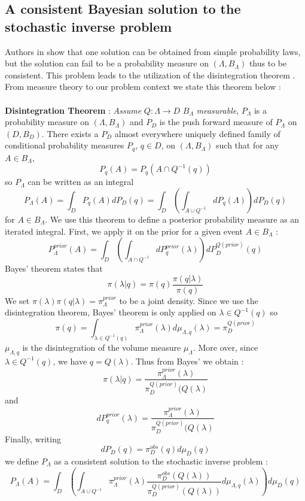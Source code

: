 \documentclass[11pt, a4paper, English]{report}
\begin{document}
\subsection{A consistent Bayesian solution to the stochastic inverse problem}
Authors in \cite{Tim1} show that one solution can be obtained from simple probability laws, but the solution can fail to be a probability measure on $(\Lambda, B_\Lambda)$ thus to be consistent. This problem leads to the utilization of the disintegration theorem \cite{desintegration}. From measure theory to our problem context we state this theorem below :
\\\\
\textbf{Disintegration Theorem} : \textit{Assume} $Q:\Lambda \rightarrow D$ $B_\Lambda$ \textit{measurable}, $P_\Lambda$ is a probability measure on $(\Lambda, B_\Lambda)$ and $P_D$ is the push forward measure of $P_\Lambda$ on $(D, B_D)$. There exists a $P_D$ almost everywhere uniquely defined family of conditional probability measures $P_q$, $q \in D$, on $(\Lambda, B_\Lambda)$ such that for any $A \in B_\Lambda$,
$$P_q(A) = P_q(A \cap Q^{-1}(q))$$
so $P_\Lambda$ can be written as an integral 
$$P_\Lambda(A) = \int_D P_q(A)dP_D(q) = \int_D(\int_{A\cup Q^{-1}} dP_q(\Lambda) )dP_D(q) $$
for $A \in B_\Lambda$. We use this theorem to define a posterior probability measure as an iterated integral. First, we apply it on the prior for a given event $A \in B_\Lambda$ : 
$$ P_\Lambda^{prior}(A) = \int_D (\int_{A\cap Q^{-1}}dP_q^{prior}(\lambda))dP_D^{Q(prior)}(q)$$
Bayes' theorem states that 
$$\pi(\lambda|q) = \pi(q) \frac{\pi(q|\lambda)}{\pi(q)}$$
We set $\pi(\lambda)\pi(q|\lambda) = \pi_\Lambda^{prior}$ to be a joint density. Since we use the disintegration theorem, Bayes' theorem is only applied on $\lambda \in Q^{-1}(q)$ so 
$$\pi(q) = \int_{\lambda \in Q^{-1}(q)} \pi_\Lambda^{prior}(\lambda) d\mu_{\Lambda,q}(\lambda)=\pi_D^{Q(prior)} $$
$\mu_{\Lambda, q}$ is the disintegration of the volume measure $\mu_\Lambda$. More over, since $\lambda \in Q^{-1}(q)$, we have $q=Q(\lambda)$. Thus from Bayes' we obtain :
$$\pi(\lambda|q) = \frac{\pi_\Lambda^{prior}(\lambda)}{\pi_D^{Q(prior)}(Q(\lambda)} $$
and
$$dP_q^{prior}(\lambda) = \frac{\pi_\Lambda^{prior}(\lambda)}{\pi_D^{Q(prior)} (Q(\lambda)} $$
Finally, writing 
$$dP_D(q) = \pi_D^{obs}(q) d\mu_D(q) $$
we define $P_\Lambda$ as a consistent solution to the stochastic inverse problem :
$$P_\Lambda(A) = \int_D(\int_{A\cup Q^{-1}} \pi_\Lambda^{prior}(\lambda)\frac{\pi_D^{obs}(Q(\lambda))}{\pi_D^{Q(prior)}(Q(\lambda))} d\mu_{\Lambda,q}(\lambda) )d\mu_D(q) $$
\end{document}
